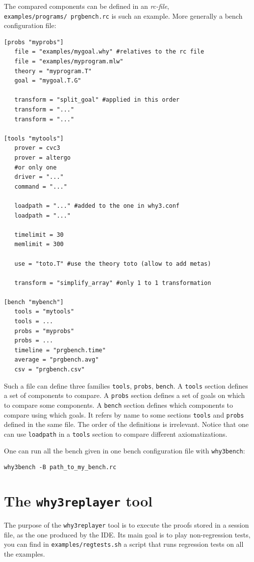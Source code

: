 The compared components can be defined in an \emph{rc-file},
\texttt{examples/programs/\ prgbench.rc} is such an example. More
generally a bench configuration file:
\begin{verbatim}
[probs "myprobs"]
   file = "examples/mygoal.why" #relatives to the rc file
   file = "examples/myprogram.mlw"
   theory = "myprogram.T"
   goal = "mygoal.T.G"

   transform = "split_goal" #applied in this order
   transform = "..."
   transform = "..."

[tools "mytools"]
   prover = cvc3
   prover = altergo
   #or only one
   driver = "..."
   command = "..."

   loadpath = "..." #added to the one in why3.conf
   loadpath = "..."

   timelimit = 30
   memlimit = 300

   use = "toto.T" #use the theory toto (allow to add metas)

   transform = "simplify_array" #only 1 to 1 transformation

[bench "mybench"]
   tools = "mytools"
   tools = ...
   probs = "myprobs"
   probs = ...
   timeline = "prgbench.time"
   average = "prgbench.avg"
   csv = "prgbench.csv"
\end{verbatim}

Such a file can define three families \texttt{tools}, \texttt{probs},
\texttt{bench}. A \texttt{tools} section defines a set of components to
compare. A \texttt{probs} section defines a set of goals on which to compare some
components. A \texttt{bench} section defines which components to
compare using which goals. It refers by name to some sections
\texttt{tools} and \texttt{probs} defined in the same file. The order
of the definitions is irrelevant. Notice that one can use
\texttt{loadpath} in a \texttt{tools} section to compare different
axiomatizations.

One can run all the bench given in one bench configuration file with
\texttt{why3bench}:
\begin{verbatim}
why3bench -B path_to_my_bench.rc
\end{verbatim}

\section{The \texttt{why3replayer} tool}
\label{sec:why3replayer}

The purpose of the \texttt{why3replayer} tool is to execute the proofs
stored in a \why session file, as the one produced by the IDE. Its
main goal is to play non-regression tests, \eg you can find in
\texttt{examples/regtests.sh} a script that runs regression tests on
all the examples.

